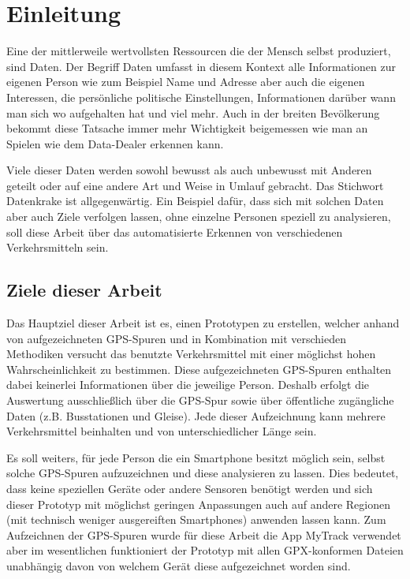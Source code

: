\chapter{Einleitung}
Eine der mittlerweile wertvollsten Ressourcen die der Mensch selbst produziert, sind Daten. Der Begriff Daten umfasst in diesem Kontext alle Informationen zur eigenen Person wie zum Beispiel Name und Adresse aber auch die eigenen Interessen, die persönliche politische Einstellungen, Informationen darüber wann man sich wo aufgehalten hat und viel mehr. Auch in der breiten Bevölkerung bekommt diese Tatsache immer mehr Wichtigkeit beigemessen wie man an Spielen wie dem Data-Dealer erkennen kann.

Viele dieser Daten werden sowohl  bewusst als auch unbewusst mit Anderen geteilt oder auf eine andere Art und Weise in Umlauf gebracht. Das Stichwort Datenkrake ist allgegenwärtig. Ein Beispiel dafür, dass sich mit solchen Daten aber auch Ziele verfolgen lassen, ohne einzelne Personen speziell zu analysieren, soll diese Arbeit über das automatisierte Erkennen von verschiedenen Verkehrsmitteln sein. 

\section{Ziele dieser Arbeit}
Das Hauptziel dieser Arbeit ist es, einen Prototypen zu erstellen, welcher anhand von aufgezeichneten GPS-Spuren und in Kombination mit verschieden Methodiken versucht das benutzte  Verkehrsmittel mit einer möglichst hohen Wahrscheinlichkeit zu bestimmen. Diese aufgezeichneten GPS-Spuren enthalten dabei keinerlei Informationen über die jeweilige Person. Deshalb erfolgt die Auswertung ausschließlich über die GPS-Spur sowie über öffentliche zugängliche Daten (z.B. Busstationen und Gleise). Jede dieser Aufzeichnung kann mehrere Verkehrsmittel beinhalten und von unterschiedlicher Länge sein.

Es soll weiters, für jede Person die ein Smartphone besitzt möglich sein, selbst solche GPS-Spuren aufzuzeichnen und diese analysieren zu lassen. Dies bedeutet, dass keine speziellen Geräte oder andere Sensoren benötigt werden und sich dieser Prototyp mit möglichst geringen Anpassungen auch auf andere Regionen (mit technisch weniger ausgereiften Smartphones) anwenden lassen kann. Zum Aufzeichnen der GPS-Spuren wurde für diese Arbeit die App MyTrack verwendet aber im wesentlichen funktioniert der Prototyp mit allen GPX-konformen Dateien unabhängig davon von welchem Gerät diese aufgezeichnet worden sind.

